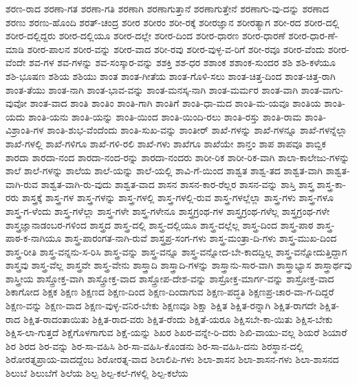 {ಶರಣ-ರಾದ
ಶರಣಾ-ಗತ
ಶರಣಾ-ಗತಿ
ಶರಣಾಗಿ
ಶರಣಾಗುತ್ತಾನೆ
ಶರಣಾಗುತ್ತೇನೆ
ಶರಣಾಗು-ವು-ದನ್ನು
ಶರಣಾದ
ಶರಣು
ಶರಣು-ಹೊಂದಿ
ಶರತ್-ಚಂದ್ರ
ಶರೀರ
ಶರೀರಂ
ಶರೀ-ರಕ್ಕೆ
ಶರೀರಜ್ಞಾನ
ಶರೀರತ್ಯಾಗ
ಶರೀ-ರದ
ಶರೀರ-ದಲ್ಲಿ
ಶರೀರ-ದಲ್ಲಿದ್ದರು
ಶರೀರ-ದಲ್ಲಿಯೂ
ಶರೀರ-ದಲ್ಲೇ
ಶರೀರ-ದಿಂದ
ಶರೀರ-ಧಾರಣ
ಶರೀರ-ಧಾರಣೆ
ಶರೀರ-ಧಾರ-ಣೆ-ಮಾಡಿ
ಶರೀರ-ಪಾಲನ
ಶರೀರ-ವನ್ನು
ಶರೀರ-ವಾದ
ಶರೀ-ರವು
ಶರೀರ-ವುಳ್ಳ-ವ-ರಿಗೆ
ಶರೀ-ರವೂ
ಶರೀರ-ವೆಂದು
ಶರೀರ-ವೆಂದೇ
ಶವ-ಗಳ
ಶವ-ಗಳನ್ನು
ಶವ-ಸಂಸ್ಕಾರ-ವನ್ನು
ಶಶಕ್ತಿ
ಶಶ-ಧರ
ಶಶಾಂಕ
ಶಶಾಂಕ-ಸುಂದರ
ಶಶಿ
ಶಶಿ-ಕಳೆಯೂ
ಶಶಿ-ಭೂಷಣ
ಶಶಿಯ
ಶಶಿಯು
ಶಾಂತ
ಶಾಂತ-ಗೀತೆಯ
ಶಾಂತ-ಗೊಳಿ-ಸಲು
ಶಾಂತ-ಚಿತ್ತ-ದಿಂದ
ಶಾಂತ-ಚಿತ್ತ-ರಾಗಿ
ಶಾಂತ-ತೆಯು
ಶಾಂತ-ನಾಗಿ
ಶಾಂತ-ಭಾವ-ವನ್ನು
ಶಾಂತ-ಮನಸ್ಕ-ನಾಗಿ
ಶಾಂತ-ಮರ್ಮರ
ಶಾಂತ-ವಾಗಿ
ಶಾಂತ-ವಾಗು-ವುವೋ
ಶಾಂತ-ವಾದ
ಶಾಂತಿ
ಶಾಂತಿಂ
ಶಾಂತಿ-ಗಾಗಿ
ಶಾಂತಿಗೆ
ಶಾಂತಿ-ಧಾ-ಮದ
ಶಾಂತಿ-ಮ-ಯವೂ
ಶಾಂತಿಯ
ಶಾಂತಿ-ಯದು
ಶಾಂತಿ-ಯನು
ಶಾಂತಿ-ಯನ್ನು
ಶಾಂತಿ-ಯಿಂದ
ಶಾಂತಿ-ಯಿಂದಿ-ರಲು
ಶಾಂತಿ-ರಸ್ತು
ಶಾಂತಿ-ರಾಮ
ಶಾಂತಿ-ವಿಶ್ರಾಂತಿ-ಗಳ
ಶಾಂತಿ-ಶುಭ-ವೆಂದೆಂದು
ಶಾಂತಿ-ಸುಖ-ವನ್ನು
ಶಾಂತೀರ್
ಶಾಖೆ-ಗಳನ್ನು
ಶಾಖೆ-ಗಳನ್ನೂ
ಶಾಖೆ-ಗಳನ್ನೆಲ್ಲಾ
ಶಾಖೆ-ಗಳಲ್ಲಿ
ಶಾಖೆ-ಗಳಿಗೂ
ಶಾಖೆ-ಗಳಿ-ರಲಿ
ಶಾಖೆ-ಗಳು
ಶಾಖೆಗೂ
ಶಾಖೆಯೇ
ಶಾನ್ತಂ
ಶಾಪ
ಶಾಪವೂ
ಶಾಬ್ದಿಕ
ಶಾರದಾ
ಶಾರದಾ-ನಂದ
ಶಾರದಾ-ನಂದ-ರನ್ನು
ಶಾರದಾ-ನಂದರು
ಶಾರೀ-ರಿಕ
ಶಾರೀ-ರಿಕ-ವಾಗಿ
ಶಾಲಾ-ಕಾಲೇಜು-ಗಳನ್ನು
ಶಾಲೆ
ಶಾಲೆ-ಗಳನ್ನು
ಶಾಲೆಯ
ಶಾಲೆ-ಯನ್ನು
ಶಾಲೆ-ಯಲ್ಲಿ
ಶಾವಿ-ಗೆ-ಯಿಂದ
ಶಾಶ್ವತ
ಶಾಶ್ವ-ತದ
ಶಾಶ್ವತ-ವಾಗಿ
ಶಾಶ್ವತ-ವಾಗಿ-ರುವ
ಶಾಶ್ವತ-ವಾಗಿ-ರು-ವುದು
ಶಾಶ್ವತ-ವಾದ
ಶಾಸನ
ಶಾಸನ-ಕಾರ-ರೆಲ್ಲರ
ಶಾಸನ-ವನ್ನು
ಶಾಸ್ತಿ
ಶಾಸ್ತ್ರ
ಶಾಸ್ತ್ರ-ಕಾ-ರರು
ಶಾಸ್ತ್ರಕ್ಕೆ
ಶಾಸ್ತ್ರ-ಗಳ
ಶಾಸ್ತ್ರ-ಗಳನ್ನು
ಶಾಸ್ತ್ರ-ಗಳಲ್ಲಿ
ಶಾಸ್ತ್ರ-ಗಳಲ್ಲಿ-ರುವ
ಶಾಸ್ತ್ರ-ಗಳಲ್ಲೆಲ್ಲಾ
ಶಾಸ್ತ್ರ-ಗಳು
ಶಾಸ್ತ್ರ-ಗಳೂ
ಶಾಸ್ತ್ರ-ಗ-ಳೆಂದು
ಶಾಸ್ತ್ರ-ಗಳೆಲ್ಲಾ
ಶಾಸ್ತ್ರ-ಗಳೇ
ಶಾಸ್ತ್ರ-ಗಳೇನೂ
ಶಾಸ್ತ್ರಗ್ರಂಥ-ಗಳ
ಶಾಸ್ತ್ರಗ್ರಂಥ-ಗಳೆಲ್ಲ
ಶಾಸ್ತ್ರಗ್ರಂಥ-ಗಳೇ
ಶಾಸ್ತ್ರಜ್ಞಾನಾಡಂಬರ-ಗಳಿಂದ
ಶಾಸ್ತ್ರದ
ಶಾಸ್ತ್ರ-ದಲ್ಲಿ
ಶಾಸ್ತ್ರ-ದಲ್ಲಿಯೂ
ಶಾಸ್ತ್ರ-ದಲ್ಲೆಲ್ಲ
ಶಾಸ್ತ್ರ-ದಿಂದ
ಶಾಸ್ತ್ರ-ಪಾಠ
ಶಾಸ್ತ್ರ-ಪಾಠ-ಕ-ನಾಗಿಯೂ
ಶಾಸ್ತ್ರ-ಪಾರಂಗತ-ನಾಗಿ-ರುವೆ
ಶಾಸ್ತ್ರಪ್ರ-ಸಂಗ-ಗಳು
ಶಾಸ್ತ್ರ-ಮಂತ್ರಾ-ದಿ-ಗಳು
ಶಾಸ್ತ್ರ-ಮುಖ-ದಿಂದ
ಶಾಸ್ತ್ರ-ರೀತಿ
ಶಾಸ್ತ್ರ-ವನ್ನನು-ಸ-ರಿಸಿ
ಶಾಸ್ತ್ರ-ವನ್ನು
ಶಾಸ್ತ್ರ-ವನ್ನೂ
ಶಾಸ್ತ್ರ-ವನ್ನೋದ-ಬೇ-ಕಾದದ್ದಿಲ್ಲ
ಶಾಸ್ತ್ರ-ವನ್ನೋದುತ್ತಿದ್ದಾಗ
ಶಾಸ್ತ್ರವು
ಶಾಸ್ತ್ರ-ವೆಲ್ಲ
ಶಾಸ್ತ್ರವೇ
ಶಾಸ್ತ್ರ-ವೇನು
ಶಾಸ್ತ್ರಾದಿ
ಶಾಸ್ತ್ರಾದಿ-ಗಳನ್ನು
ಶಾಸ್ತ್ರಾನು-ಸಾರ-ವಾಗಿ
ಶಾಸ್ತ್ರಾಭ್ಯಾಸ
ಶಾಸ್ತ್ರಾರ್ಥವು
ಶಾಸ್ತ್ರೀಯ
ಶಾಸ್ತ್ರೋಕ್ತ-ವಾಗಿ
ಶಾಸ್ತ್ರೋಕ್ತ-ವಾದ
ಶಾಸ್ತ್ರೋಪ-ದೇಶ-ವನ್ನು
ಶಾಸ್ರೋಕ್ತ-ಮಾರ್ಗ-ವನ್ನು
ಶಾಸ್ರೋಕ್ತ-ವಾದ
ಶಿಕಾಗೋದ
ಶಿಕ್ಷಕ
ಶಿಕ್ಷಣ
ಶಿಕ್ಷಣದ
ಶಿಕ್ಷಣ-ದಿಂದ
ಶಿಕ್ಷಣ-ದಿಂದಾಗುವ
ಶಿಕ್ಷಣ-ಪದ್ಧತಿ
ಶಿಕ್ಷಣಪ್ರ-ಚಾರ-ವಾ-ಗ-ದಿದ್ದರೆ
ಶಿಕ್ಷಣ-ವನ್ನು
ಶಿಕ್ಷಣ-ವಾದ
ಶಿಕ್ಷಣ-ವುಳ್ಳ-ವನಿರ-ಬೇಕು
ಶಿಕ್ಷಣವೂ
ಶಿಕ್ಷಾ
ಶಿಕ್ಷಿತ
ಶಿಕ್ಷಿತ-ರನ್ನಾಗಿ
ಶಿಕ್ಷಿತ-ರಾಗದೇ
ಶಿಕ್ಷಿತ-ರಾದ
ಶಿಕ್ಷಿತ-ರಾದಂತಾಯಿತು
ಶಿಕ್ಷಿತ-ರಾದ-ವರು
ಶಿಕ್ಷಿತ-ರೆಂದು
ಶಿಕ್ಷಿತೆ-ಯರೂ
ಶಿಕ್ಷಿಸಬೇ-ಕಾ-ಯಿತು
ಶಿಕ್ಷಿಸ-ಬೇಕು
ಶಿಕ್ಷಿಸ-ಲಾ-ಗುತ್ತದೆ
ಶಿಕ್ಷೆಗೊಳಗಾಗುವ
ಶಿಕ್ಷೆ-ಯನ್ನು
ಶಿಖರ
ಶಿಖರ-ವನ್ನೇ-ರಿ-ದರು
ಶಿಖಿ-ವಾಯು-ವಲ್ಲ
ಶಿಯರೆ
ಶಿಯಾರೆ
ಶಿರ
ಶಿರದ
ಶಿರ-ವನ್ನು
ಶಿರ-ಸಾ-ವಹಿಸಿ
ಶಿರ-ಸಾ-ವಹಿಸಿ-ಕೊಂಡನು
ಶಿರ-ಸಾ-ವಹಿಸಿ-ದನು
ಶಿರಸ್ಥಾನ-ದಲ್ಲಿ
ಶಿರೋರತ್ನಪ್ರಾಯ-ವಾದದ್ದೆಂಬ
ಶಿರೋರತ್ನ-ವಾದ
ಶಿಲಾಲಿಪಿ-ಗಳು
ಶಿಲಾ-ಶಾಸನ
ಶಿಲಾ-ಶಾಸನ-ಗಳು
ಶಿಲಾ-ಶಾಸನದ
ಶಿಲುಬೆ
ಶಿಲುಬೆಗೆ
ಶಿಲೆಯ
ಶಿಲ್ಪ
ಶಿಲ್ಪ-ಕಲೆ-ಗಳಲ್ಲಿ
ಶಿಲ್ಪ-ಕಲೆಯ
}
